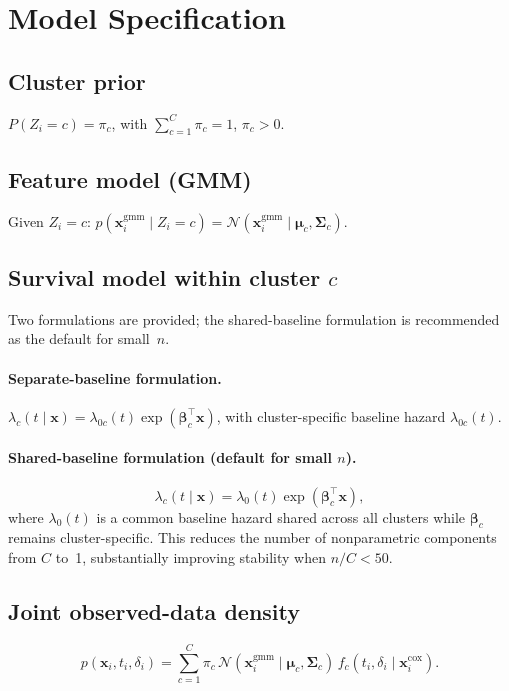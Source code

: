 \documentclass[11pt]{article}
\newcommand{\bx}{\mathbf{x}}
\newcommand{\bmu}{\boldsymbol{\mu}}
\newcommand{\bSigma}{\boldsymbol{\Sigma}}
\newcommand{\bbeta}{\boldsymbol{\beta}}
\newcommand{\rev}[1]{\textcolor{revcolor}{#1}}
\newenvironment{revblock}{\color{revcolor}}{}
\begin{document}
\section{Model Specification}

\subsection{Cluster prior}
$P(Z_i = c) = \pi_c$, with $\sum_{c=1}^C \pi_c = 1$, $\pi_c > 0$.

\subsection{Feature model (GMM)}
Given $Z_i=c$: \; $p(\bx_i^{\mathrm{gmm}} \mid Z_i\!=\!c) = \mathcal{N}(\bx_i^{\mathrm{gmm}} \mid \bmu_c, \bSigma_c)$.

\subsection{Survival model within cluster $c$}

\rev{Two formulations are provided; the shared-baseline formulation is recommended as the default for small~$n$.}

\paragraph{Separate-baseline formulation.}
$\lambda_c(t\mid\bx) = \lambda_{0c}(t)\exp(\bbeta_c^\top\bx)$, with cluster-specific baseline hazard $\lambda_{0c}(t)$.

\begin{revblock}
\paragraph{Shared-baseline formulation (default for small $n$).}\label{sec:shared-baseline}
\begin{equation}\label{eq:shared-baseline}
  \lambda_c(t\mid\bx) = \lambda_0(t)\exp(\bbeta_c^\top\bx),
\end{equation}
where $\lambda_0(t)$ is a common baseline hazard shared across all clusters while $\bbeta_c$ remains cluster-specific. This reduces the number of nonparametric components from $C$ to~1, substantially improving stability when $n/C < 50$.
\end{revblock}

\subsection{Joint observed-data density}
\begin{equation}
  p(\bx_i, t_i, \delta_i) = \sum_{c=1}^C \pi_c\,\mathcal{N}(\bx_i^{\mathrm{gmm}}\mid\bmu_c,\bSigma_c)\,f_c(t_i,\delta_i\mid\bx_i^{\mathrm{cox}}).
\end{equation}
\end{document}
